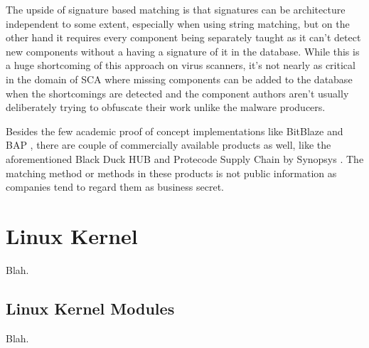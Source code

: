 The upside of signature based matching is that signatures can be architecture independent to some
extent, especially when using string matching, but on the other hand it requires every component
being separately taught as it can't detect new components without a having a signature of it in the
database. While this is a huge shortcoming of this approach on virus scanners, it's not nearly as
critical in the domain of SCA where missing components can be added to the database when the
shortcomings are detected and the component authors aren't usually deliberately trying to obfuscate
their work unlike the malware producers.

Besides the few academic proof of concept implementations like BitBlaze \cite{song2008bitblaze} and
BAP \cite{brumley2011bap}, there are couple of commercially available products as well, like the
aforementioned Black Duck HUB \cite{blackduckhub} and Protecode Supply Chain by Synopsys
\cite{synopsysprotecodesc}. The matching method or methods in these products is not public
information as companies tend to regard them as business secret.

\section{Linux Kernel}

Blah.

\subsection{Linux Kernel Modules}

Blah.
